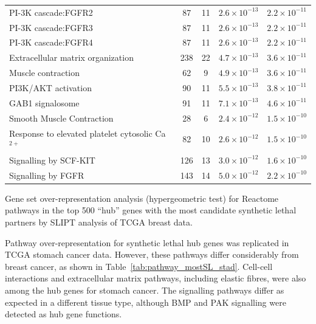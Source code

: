\begin{table}[!ht]
{\begin{threeparttable}
\begin{tabular}{lcccc}
  \rowcolor{black!5}
  PI-3K cascade:FGFR2 &  87 &  11 & $2.6 \times 10^{-13}$ & $2.2 \times 10^{-11}$ \\ 
  \rowcolor{black!10}
  PI-3K cascade:FGFR3 &  87 &  11 & $2.6 \times 10^{-13}$ & $2.2 \times 10^{-11}$ \\ 
  \rowcolor{black!5}
  PI-3K cascade:FGFR4 &  87 &  11 & $2.6 \times 10^{-13}$ & $2.2 \times 10^{-11}$ \\ 
  \rowcolor{black!10}
  Extracellular matrix organization & 238 &  22 & $4.7 \times 10^{-13}$ & $3.6 \times 10^{-11}$ \\ 
  \rowcolor{black!5}
  Muscle contraction &  62 &   9 & $4.9 \times 10^{-13}$ & $3.6 \times 10^{-11}$ \\ 
  \rowcolor{black!10}
  PI3K/AKT activation &  90 &  11 & $5.5 \times 10^{-13}$ & $3.8 \times 10^{-11}$ \\ 
  \rowcolor{black!5}
  GAB1 signalosome &  91 &  11 & $7.1 \times 10^{-13}$ & $4.6 \times 10^{-11}$ \\ 
  \rowcolor{black!10}
  Smooth Muscle Contraction &  28 &   6 & $2.4 \times 10^{-12}$ & $1.5 \times 10^{-10}$ \\ 
  \rowcolor{black!5}
  Response to elevated platelet cytosolic Ca$^{2+}$ &  82 &  10 & $2.6 \times 10^{-12}$ & $1.5 \times 10^{-10}$ \\ 
  \rowcolor{black!10}
  Signalling by SCF-KIT & 126 &  13 & $3.0 \times 10^{-12}$ & $1.6 \times 10^{-10}$ \\ 
  \rowcolor{black!5}
  Signalling by FGFR & 143 &  14 & $5.0 \times 10^{-12}$ & $2.2 \times 10^{-10}$ \\ 
   \hline
\end{tabular}
\begin{tablenotes}
\raggedright \small
Gene set over-representation analysis (hypergeometric test) for Reactome pathways in the top 500 ``hub'' genes with the most candidate \gls{synthetic lethal} partners by \gls{SLIPT} analysis of \gls{TCGA} breast  data.
\end{tablenotes}
\end{threeparttable}
}
\end{table}

Pathway over-representation for \gls{synthetic lethal} hub genes was replicated in \gls{TCGA} stomach cancer  data. However, these pathways differ considerably from breast cancer, as shown in Table~\ref{tab:pathway_mostSL_stad}. Cell-cell interactions and extracellular matrix pathways, including elastic fibres, were also among the hub genes for stomach cancer. The signalling pathways differ as expected in a different tissue type, although BMP and PAK signalling were detected as hub gene functions.
\fi

